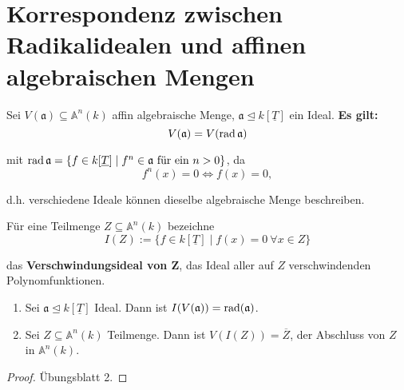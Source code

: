 
\section{Korrespondenz zwischen Radikalidealen und affinen algebraischen Mengen}
\label{sec:radikalideale-und-algebraische-mengen}

Sei $V(\mathfrak{a})\subseteq\mathbb{A}^{n}(k)$ affin algebraische
Menge, $\mathfrak{a}\unlhd k[\underline{T}]$ ein Ideal.\textbf{ Es gilt:}
\[
  V(\mathfrak{a})=V(\operatorname{rad}\mathfrak{a})
\]

mit $\operatorname{rad}\mathfrak{a}=\{f\in k[\underline{T}]\mid f^{n}\in\mathfrak{a}\text{ für ein }n>0\}$,
da
\[
  f^{n}(x)=0\Leftrightarrow f(x)=0,
\]

d.h. verschiedene Ideale können dieselbe algebraische Menge beschreiben.
\begin{defn}
  \label{def:verschwindungsideal}
  Für eine Teilmenge $Z\subseteq\mathbb{A}^{n}(k)$ bezeichne
  \[
    I(Z):=\{f\in k[\underline{T}]\mid f(x)=0\ \forall x\in Z\}
  \]

  das \textbf{Verschwindungsideal von Z}, das Ideal aller auf $Z$ verschwindenden Polynomfunktionen.
\end{defn}
\begin{prop}
  \label{prop:verschwindungsmenge-verschwindungsideal}
  \mbox{}
  \begin{enumerate}
  \item Sei $\mathfrak{a}\unlhd k[\underline{T}]$ Ideal. Dann ist $I(V(\mathfrak{a}))=\operatorname{rad}(\mathfrak{a})$.
  \item Sei $Z\subseteq\mathbb{A}^{n}(k)$ Teilmenge. Dann ist $V(I(Z))=\overline{Z}$,
    der Abschluss von $Z$ in $\mathbb{A}^{n}(k)$.
  \end{enumerate}
\end{prop}
\begin{proof}
  Übungsblatt 2.
\end{proof}
\medskip{}

